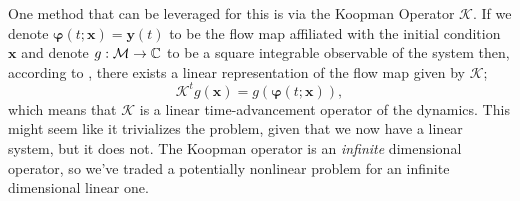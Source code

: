 One method that can be leveraged for this is via the Koopman Operator 
$\mathcal{K}$. If we denote $\boldsymbol{\varphi}(t;\boldsymbol{x}) =
\boldsymbol{y}(t)$ to be the flow map affiliated with the initial condition 
$\boldsymbol{x}$ and denote $g: \mathcal{M} \to \mathbb{C}$ to be a square integrable 
observable of the system then, according to \cite{koopman}, there exists a 
linear representation of the flow map given by $\mathcal{K}$;
$$\mathcal{K}^t g(\boldsymbol{x}) = g(\boldsymbol{\varphi}(t; \boldsymbol{x}))
,$$
which means that $\mathcal{K}$ is a linear time-advancement operator of the 
dynamics. This might seem like it trivializes the problem, given that we now 
have a linear system, but it does not. The Koopman operator is an 
\emph{infinite} dimensional operator, so we've traded a potentially nonlinear 
problem for an infinite dimensional linear one.

